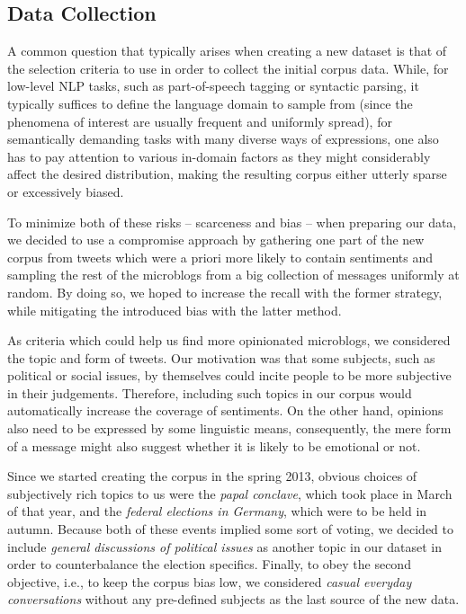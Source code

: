 \subsection{Data Collection}

A common question that typically arises when creating a new dataset is
that of the selection criteria to use in order to collect the initial
corpus data.  While, for low-level NLP tasks, such as part-of-speech
tagging or syntactic parsing, it typically suffices to define the
language domain to sample from (since the phenomena of interest are
usually frequent and uniformly spread), for semantically demanding
tasks with many diverse ways of expressions, one also has to pay
attention to various in-domain factors as they might considerably
affect the desired distribution, making the resulting corpus either
utterly sparse or excessively biased.

To minimize both of these risks -- scarceness and bias -- when
preparing our data, we decided to use a compromise approach by
gathering one part of the new corpus from tweets which were a priori
more likely to contain sentiments and sampling the rest of the
microblogs from a big collection of messages uniformly at random.  By
doing so, we hoped to increase the recall with the former strategy,
while mitigating the introduced bias with the latter method.

As criteria which could help us find more opinionated microblogs, we
considered the topic and form of tweets.  Our motivation was that some
subjects, such as political or social issues, by themselves could
incite people to be more subjective in their judgements.  Therefore,
including such topics in our corpus would automatically increase the
coverage of sentiments.  On the other hand, opinions also need to be
expressed by some linguistic means, consequently, the mere form of a
message might also suggest whether it is likely to be emotional or
not.

Since we started creating the corpus in the spring 2013, obvious
choices of subjectively rich topics to us were the \emph{papal
  conclave}, which took place in March of that year, and the
\emph{federal elections in Germany}, which were to be held in autumn.
Because both of these events implied some sort of voting, we decided
to include \emph{general discussions of political issues} as another
topic in our dataset in order to counterbalance the election
specifics.  Finally, to obey the second objective, i.e., to keep the
corpus bias low, we considered \emph{casual everyday conversations}
without any pre-defined subjects as the last source of the new data.

